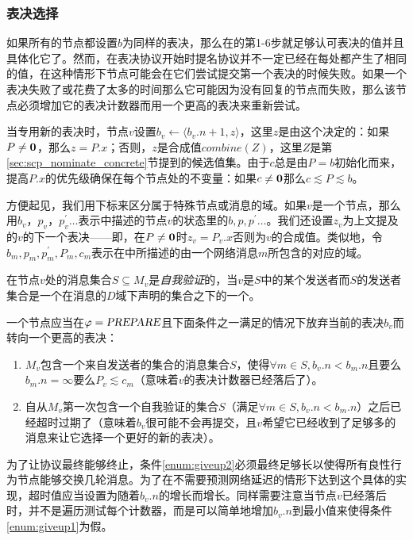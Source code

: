 \subsubsection{表决选择}

如果所有的节点都设置$b$为同样的表决，那么在的第1-6步就足够认可表决的值并且具体化它了。然而，在表决协议开始时提名协议并不一定已经在每处都产生了相同的值，在这种情形下节点可能会在它们尝试提交第一个表决的时候失败。如果一个表决失败了或花费了太多的时间那么它可能因为没有回复的节点而失败，那么该节点必须增加它的表决计数器而用一个更高的表决来重新尝试。

当专用新的表决时，节点$v$设置$b_v\leftarrow \langle b_v.n+1,z\rangle$，这里$z$是由这个决定的：如果$P\neq {\bm 0}$，那么$z=P.x$；否则，$z$是合成值$combine(Z)$，这里$Z$是第\ref{sec:scp_nominate_concrete}节提到的候选值集。由于$c$总是由$P=b$初始化而来，提高$P.x$的优先级确保在每个节点处的不变量：如果$c\neq {\bm 0}$那么$c\lesssim P\lesssim b$。

方便起见，我们用下标来区分属于特殊节点或消息的域。如果$v$是一个节点，那么用$b_v$，$p_v$，$p_v^{\prime}\ldots$表示中描述的节点$v$的状态里的$b,p,p^{\prime}\ldots$。我们还设置$z_v$为上文提及的$v$的下一个表决——即，在$P\neq {\bm 0}$时$z_v=P_v.x$否则为$v$的合成值。类似地，令$b_m,p_m,p^{\prime}_m,P_m,c_m$表示在中所描述的由一个网络消息$m$所包含的对应的域。

\begin{definition}[自我验证]
	在节点$v$处的消息集合$S\subseteq M_v$是\textit{自我验证}的，当$v$是$S$中的某个发送者而$S$的发送者集合是一个在消息的$D$域下声明的{\quorum}集合之下的一个{\quorum}。
\end{definition}

一个节点应当在$\varphi=\textsl{PREPARE}$且下面条件之一满足的情况下放弃当前的表决$b_v$而转向一个更高的表决：

\begin{enumerate}
	\item\label{enum:giveup1} $M_v$包含一个来自发送者的{\vblock}集合的消息集合$S$，使得$\forall m\in S,b_v.n<b_m.n$且要么$b_m.n=\infty$要么$P_v\lesssim c_m$（意味着$v$的表决计数器已经落后了）。
	\item\label{enum:giveup2} 自从$M_v$第一次包含一个自我验证的集合$S$（满足$\forall m\in S,b_v.n<b_m.n$）之后已经超时过期了（意味着$b_v$很可能不会再提交，且$v$希望它已经收到了足够多的消息来让它选择一个更好的新的表决）。
\end{enumerate}

为了让协议最终能够终止，条件\ref{enum:giveup2}必须最终足够长以使得所有良性行为节点能够交换几轮消息。为了在不需要预测网络延迟的情形下达到这个具体的实现，超时值应当设置为随着$b_v.n$的增长而增长。同样需要注意当节点$v$已经落后时，并不是遍历测试每个计数器，而是可以简单地增加$b_v.n$到最小值来使得条件\ref{enum:giveup1}为假。